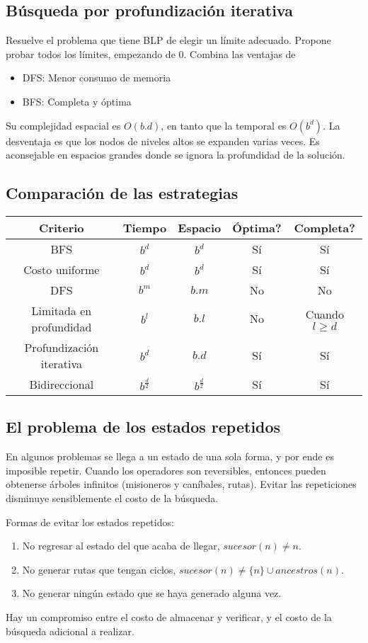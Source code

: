 \subsection{Búsqueda por profundización iterativa}
Resuelve el problema que tiene BLP de elegir un límite adecuado. Propone probar
todos los límites, empezando de 0. Combina las ventajas de
\begin{itemize}
    \item DFS: Menor consumo de memoria
    \item BFS: Completa y óptima
\end{itemize}
Su complejidad espacial es $O(b.d)$, en tanto que la temporal es $O(b^d)$.
La desventaja es que los nodos de niveles altos se expanden varias veces. Es
aconsejable en espacios grandes donde se ignora la profundidad de la solución.

\subsection{Comparación de las estrategias}
\begin{tabular}{| c | c | c | c | c |}
\hline
Criterio & Tiempo & Espacio & Óptima? & Completa? \\
\hline
BFS & $b^d$ & $b^d$ & Sí & Sí \\
\hline
Costo uniforme & $b^d$ & $b^d$ & Sí & Sí \\
\hline
DFS & $b^m$ & $b.m$ & No & No \\
\hline
Limitada en profundidad & $b^l$ & $b.l$ & No & Cuando $l \geq d$ \\
\hline
Profundización iterativa & $b^d$ & $b.d$ & Sí & Sí \\
\hline
Bidireccional & $b^{\frac{d}{2}}$ & $b^{\frac{d}{2}}$ & Sí & Sí
\hline
\end{tabular}

\subsection{El problema de los estados repetidos}
En algunos problemas se llega a un estado de una sola forma, y por ende
es imposible repetir. Cuando los operadores son reversibles, entonces
pueden obtenerse árboles infinitos (misioneros y caníbales, rutas). Evitar
las repeticiones disminuye sensiblemente el costo de la búsqueda.

Formas de evitar los estados repetidos:
\begin{enumerate}
    \item No regresar al estado del que acaba de llegar, $sucesor(n) \neq n$.
    \item No generar rutas que tengan ciclos, $sucesor(n) \neq \{n\}
        \cup ancestros(n)$.
    \item No generar ningún estado que se haya generado alguna vez.
\end{enumerate}
Hay un compromiso entre el costo de almacenar y verificar, y el costo de 
la búsqueda adicional a realizar.



